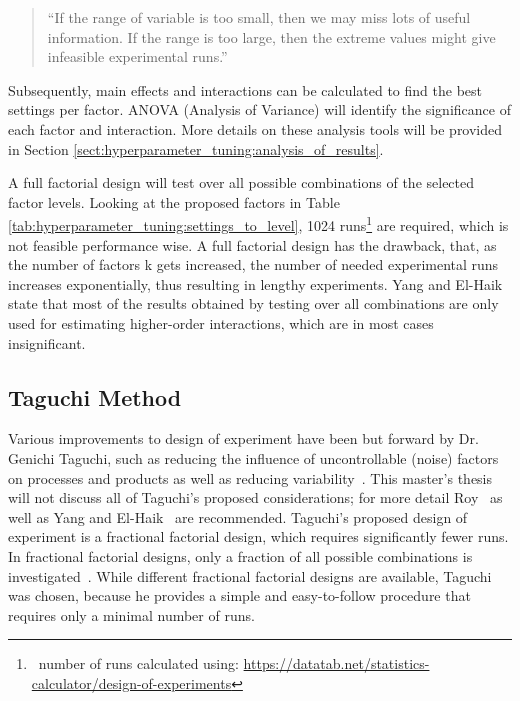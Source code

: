 \begin{quote}
	\begin{em}
		\enquote{If the range of variable is too small, then we may miss lots of useful information. If the range is too large, then the extreme values might give infeasible experimental runs.}~\cite{yang_design_2009}
	\end{em}
\end{quote}

Subsequently, main effects and interactions can be calculated to find the best settings per factor. ANOVA (Analysis of Variance) will identify the significance of each factor and interaction. More details on these analysis tools will be provided in Section \ref{sect:hyperparameter_tuning:analysis_of_results}.

A full factorial design will test over all possible combinations of the selected factor levels. Looking at the proposed factors in Table \ref{tab:hyperparameter_tuning:settings_to_level}, 1024 runs\footnote{~number of runs calculated using: \url{https://datatab.net/statistics-calculator/design-of-experiments}} are required, which is not feasible performance wise. A full factorial design has the drawback, that, as the number of factors k gets increased, the number of needed experimental runs increases exponentially, thus resulting in lengthy experiments. Yang and El-Haik~\cite{yang_design_2009} state that most of the results obtained by testing over all combinations are only used for estimating higher-order interactions, which are in most cases insignificant.

\subsection{Taguchi Method}
Various improvements to design of experiment have been but forward by Dr. Genichi Taguchi, such as reducing the influence of uncontrollable (noise) factors on processes and products as well as reducing variability~\cite{roy_primer_1990}. This master's thesis will not discuss all of Taguchi's proposed considerations; for more detail Roy~\cite{roy_primer_1990} as well as Yang and El-Haik~\cite{yang_design_2009} are recommended. Taguchi's proposed design of experiment is a fractional factorial design, which requires significantly fewer runs. In fractional factorial designs, only a fraction of all possible combinations is investigated~\cite{roy_primer_1990}. While different fractional factorial designs are available, Taguchi was chosen, because he provides a simple and easy-to-follow procedure that requires only a minimal number of runs. 

